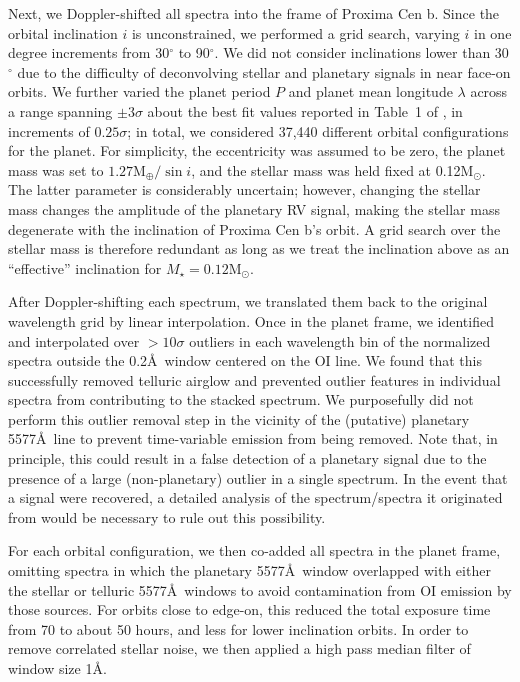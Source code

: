 \documentclass{emulateapj}
\begin{document}
Next, we Doppler-shifted all spectra into the frame of Proxima Cen b. Since the orbital inclination $i$ is unconstrained, we performed a grid search, varying $i$ in one degree increments from 30$^\circ$ to 90$^\circ$. We did not consider inclinations lower than 30$^\circ$ due to the difficulty of deconvolving stellar and planetary signals in near face-on orbits. We further varied the planet period $P$ and planet mean longitude $\lambda$ across a range spanning $\pm 3\sigma$ about the best fit values reported in Table~1 of \citet{Anglada-Escude2016}, in increments of $0.25\sigma$; in total, we considered 37,440 different orbital configurations for the planet. For simplicity, the eccentricity was assumed to be zero, the planet mass was set to $1.27\mathrm{M_\oplus}/\sin i$, and the stellar mass was held fixed at 0.12$\mathrm{M_\odot}$. The latter parameter is considerably uncertain; however, changing the stellar mass changes the amplitude of the planetary RV signal, making the stellar mass degenerate with the inclination of Proxima Cen b's orbit. A grid search over the stellar mass is therefore redundant as long as we treat the inclination above as an ``effective'' inclination for $M_\star = 0.12\mathrm{M_\odot}$.

After Doppler-shifting each spectrum, we translated them back to the original wavelength grid by linear interpolation. Once in the planet frame, we identified and interpolated over $> 10 \sigma$ outliers in each wavelength bin of the normalized spectra outside the 0.2\AA\ window centered on the OI line. We found that this successfully removed telluric airglow and prevented outlier features in individual spectra from contributing to the stacked spectrum. We purposefully did not perform this outlier removal step in the vicinity of the (putative) planetary 5577\AA\ line to prevent time-variable emission from being removed. Note that, in principle, this could result in a false detection of a planetary signal due to the presence of a large (non-planetary) outlier in a single spectrum. In the event that a signal were recovered, a detailed analysis of the spectrum/spectra it originated from would be necessary to rule out this possibility.

For each orbital configuration, we then co-added all spectra in the planet frame, omitting spectra in which the planetary 5577\AA\ window overlapped with either the stellar or telluric 5577\AA\ windows to avoid contamination from OI emission by those sources. For orbits close to edge-on, this reduced the total exposure time from 70 to about 50 hours, and less for lower inclination orbits. In order to remove correlated stellar noise, we then applied a high pass median filter of window size 1\AA.
\end{document}
